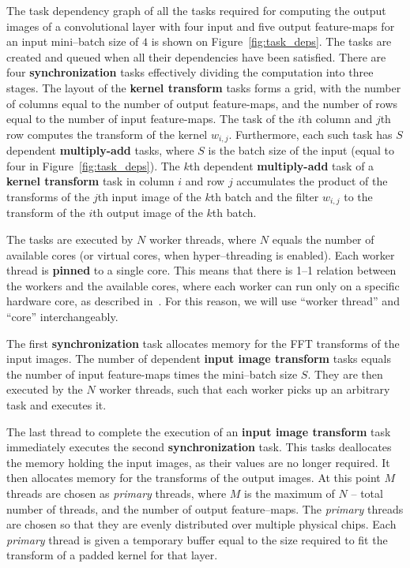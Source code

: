 \documentclass[conference]{./IEEEtran/IEEEtran}
\begin{document}
  {\color{zblack}}

  The task dependency graph of all the tasks required for computing
  the output images of a convolutional layer with four input and five
  output feature-maps for an input mini--batch size of $4$ is shown on
  Figure~\ref{fig:task_deps}.  The tasks are created and queued when
  all their dependencies have been satisfied.  There are four
  {\color{zyellow}\bf synchronization} tasks effectively dividing the
  computation into three stages.  The layout of the {\color{zblue}\bf
    kernel transform} tasks forms a grid, with the number of columns
  equal to the number of output feature-maps, and the number of rows
  equal to the number of input feature-maps.  The task of the $i$th
  column and $j$th row computes the transform of the kernel $w_{i,j}$.
  Furthermore, each such task has $S$ dependent {\color{zgreen}\bf
    multiply-add} tasks, where $S$ is the batch size of the input
  (equal to four in Figure~\ref{fig:task_deps}).  The $k$th dependent
  {\color{zgreen}\bf multiply-add} task of a {\color{zblue}\bf kernel
    transform} task in column $i$ and row $j$ accumulates the product
  of the transforms of the $j$th input image of the $k$th batch and
  the filter $w_{i,j}$ to the transform of the $i$th output image of
  the $k$th batch.

  The tasks are executed by $N$ worker threads, where $N$ equals the
  number of available cores (or virtual cores, when hyper--threading
  is enabled).  Each worker thread is {\bf pinned} to a single core.
  This means that there is 1--1 relation between the workers and the
  available cores, where each worker can run only on a specific
  hardware core, as described in~\cite{jeffers2015high}.  For this
  reason, we will use ``worker thread'' and ``core'' interchangeably.

  The first {\color{zyellow}\bf synchronization} task allocates memory
  for the FFT transforms of the input images.  The number of dependent
  {\color{zred}\bf input image transform} tasks equals the number of
  input feature-maps times the mini--batch size $S$.  They are then
  executed by the $N$ worker threads, such that each worker picks up
  an arbitrary task and executes it.

  The last thread to complete the execution of an {\color{zred}\bf
    input image transform} task immediately executes the second
  {\color{zyellow}\bf synchronization} task.  This tasks deallocates
  the memory holding the input images, as their values are no longer
  required. It then allocates memory for the transforms of the output
  images.  At this point $M$ threads are chosen as \emph{primary}
  threads, where $M$ is the maximum of $N$ -- total number of threads,
  and the number of output feature--maps.  The \emph{primary} threads
  are chosen so that they are evenly distributed over multiple
  physical chips.  Each \emph{primary} thread is given a temporary
  buffer equal to the size required to fit the transform of a padded
  kernel for that layer.
\end{document}

